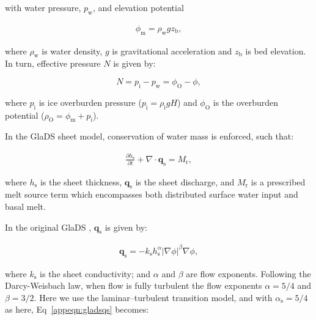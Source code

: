\documentclass[tc, manuscript]{copernicus}
\begin{document}
with water pressure, $p_{\mathrm{w}}$, and elevation potential

\begin{equation}
\label{eq:elevationpotential}
\begin{aligned}
\phi_{\mathrm{m}} = \rho_{\mathrm{w}}gz_{\mathrm{b}},
\end{aligned}
\end{equation}

where $\rho_{\mathrm{w}}$ is water density, $g$ is gravitational acceleration and $z_{\mathrm{b}}$ is bed elevation. In turn, effective pressure $N$ is given by: 

\begin{equation}
\label{appeqn}
N = p_{\mathrm{i}}-p_{\mathrm{w}} = \phi_{\mathrm{O}}-\phi,
\end{equation}

where $p_{\mathrm{i}}$ is ice overburden pressure ($p_{\mathrm{i}} = \rho_{\mathrm{i}}gH$) and $\phi_{\mathrm{O}}$ is the overburden potential ($\rho_{\mathrm{O}} = \phi_{\mathrm{m}}+p_{\mathrm{i}}$).


In the GlaDS sheet model, conservation of water mass is enforced, such that: 

\begin{equation}
\label{appeqn:Conservation}
\begin{aligned}
\frac{\partial h_{\mathrm{s}}}{\partial t} + \nabla \cdot  \mathbf{q}_{\mathrm{s}} = M_{\mathrm{r}},
\end{aligned}
\end{equation}

where $h_{\mathrm{s}}$ is the sheet thickness, $\mathbf{q}_{\mathrm{s}}$ is the sheet discharge, and $M_{\mathrm{r}}$ is a prescribed melt source term which encompasses both distributed surface water input and basal melt.

In the original GlaDS \citep{werder2013modeling}, $\mathbf{q}_{\mathrm{s}}$ is given by:

\begin{equation}
\label{appeqn:gladsqs}
\begin{aligned}
\mathbf{q}_{\mathrm{s}} = -k_{\mathrm{s}}h_{\mathrm{s}}^{\alpha}|\nabla \phi|^{\beta}\nabla \phi,
\end{aligned}
\end{equation}

where $k_{\mathrm{s}}$ is the sheet conductivity; and $\alpha$ and $\beta$ are flow exponents. Following the Darcy-Weisbach law, when flow is fully turbulent the flow exponents $\alpha=\mathrm{5/4}$ and $\beta=\mathrm{3/2}$. Here we use the \citet{hill2024improved} laminar--turbulent transition model, and with $\alpha_{\mathrm{s}}= \mathrm{5/4}$ as here, Eq~\ref{appeqn:gladsqs} becomes:  
\end{document}
